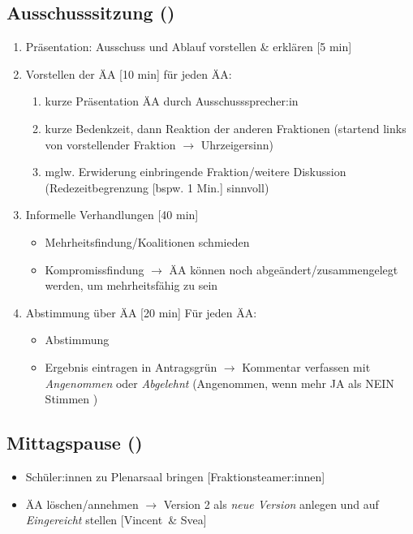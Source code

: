 \documentclass{article}
\newcommand{\KOM}{Svea}
\newcommand{\EP}{Vincent}
\begin{document}
	\subsection{Ausschusssitzung (\timeAuss)}
	\begin{enumerate}
		\item Präsentation: Ausschuss und Ablauf vorstellen \& erklären [5 min]
        \item Vorstellen der ÄA [10 min] \newline
        für jeden ÄA:
        \begin{enumerate}
            \item kurze Präsentation ÄA durch Ausschusssprecher:in
			\item kurze Bedenkzeit, dann Reaktion der anderen Fraktionen (startend links von vorstellender Fraktion $\to$ Uhrzeigersinn)
            \item mglw. Erwiderung einbringende Fraktion/weitere Diskussion \newline (Redezeitbegrenzung [bspw. 1 Min.] sinnvoll)
        \end{enumerate}
		\item Informelle Verhandlungen [40 min]
		\begin{itemize}
			\item Mehrheitsfindung/Koalitionen schmieden
			\item Kompromissfindung $\to$ ÄA können noch abgeändert/zusammengelegt werden, um mehrheitsfähig zu sein
		\end{itemize}
		\item Abstimmung über ÄA [20 min]\newline
		Für jeden ÄA:
		\begin{itemize}
			\item Abstimmung
			\item Ergebnis eintragen in Antragsgrün \newline
            $\to$ Kommentar verfassen mit \textit{Angenommen} oder \textit{Abgelehnt}
            (Angenommen, wenn mehr JA als NEIN Stimmen )
		\end{itemize}
	\end{enumerate}
	
	\subsection{Mittagspause (\timeMittag)}
	\begin{itemize}
		\item Schüler:innen zu Plenarsaal bringen [Fraktionsteamer:innen]
		\item ÄA löschen/annehmen $\to$ Version 2 als \textit{neue Version} anlegen und auf \textit{Eingereicht} stellen [\EP\ \& \KOM]
	\end{itemize}
	
\end{document}
